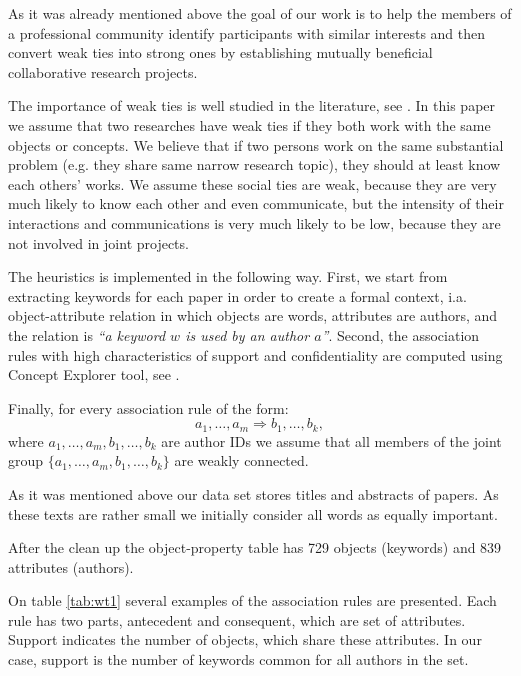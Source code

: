 \documentclass[12pt]{report}
\theoremstyle{definition}
\begin{document}
As it was already mentioned above the goal of our work is to help the members of a professional community identify participants with similar interests and then convert weak ties into strong ones by establishing mutually beneficial collaborative research projects.

The importance of weak ties is well studied in the literature, see \cite{granovetter1973strength,granovetter1983strength}.
In this paper we assume that two researches have weak ties if they both work with the same objects or concepts. We believe that if two persons work on the same substantial problem (e.g. they share same narrow research topic), they should at least know each others' works. We assume these social ties are weak, because they are very much likely to know each other and even communicate, but the intensity of their interactions and communications is very much likely to be low, because they are not involved in joint projects.

The heuristics is implemented in the following way. 
First, we start from extracting keywords for each paper in order to create a formal context, i.a. object-attribute relation in which objects are words, attributes are authors, and the relation is {\it ``a keyword $w$ is used by an author $a$''}. 
Second, the association rules with high characteristics of support and confidentiality are computed using Concept Explorer tool, see \cite{yevtushenko2006conexp,yevtushenko2000system}.

Finally, for every association rule of the form:
\begin{equation}
a_1, \ldots, a_m \Rightarrow b_1, \ldots, b_k, 
\end{equation}
where $a_1, \ldots, a_m, b_1, \ldots, b_k$ are author IDs we assume that all members of the joint group $\{a_1, \ldots, a_m,b_1, \ldots, b_k\}$
are weakly connected.

As it was mentioned above our data set stores titles and abstracts of papers. As these texts are rather small we initially consider all words as equally important.

After the clean up the object-property table has 729 objects (keywords) and 839 attributes (authors).


On table \ref{tab:wt1} several examples of the association rules are presented. Each rule has two parts, antecedent and consequent, which are set of attributes. Support indicates the number of objects, which share these attributes. In our case, support is the number of keywords common for all authors in the set.
\end{document}
